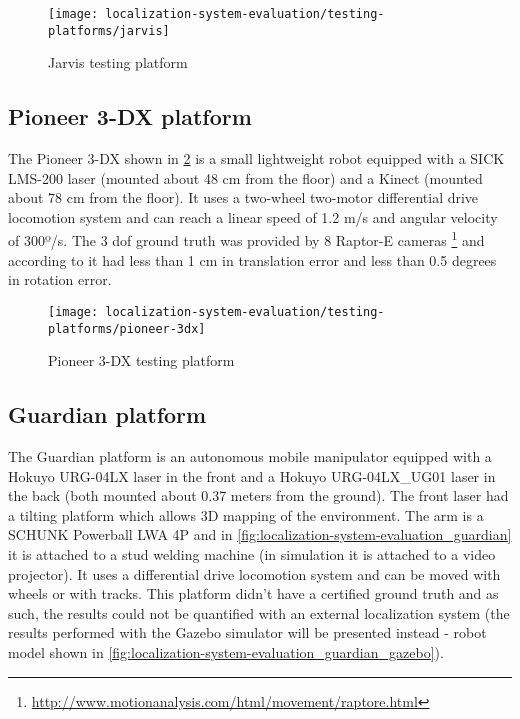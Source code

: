 \begin{figure}[H]
	\centering
	\texttt{[image: localization-system-evaluation/testing-platforms/jarvis]}
	\caption{Jarvis testing platform}
	\label{fig:localization-system-evaluation_jarvis}
\end{figure}


\subsection{Pioneer 3-DX platform}

The Pioneer 3-DX shown in \cref{fig:localization-system-evaluation_pioneer} is a small lightweight robot equipped with a SICK LMS-200 laser (mounted about 48 cm from the floor) and a Kinect (mounted about 78 cm from the floor). It uses a two-wheel two-motor differential drive locomotion system and can reach a linear speed of 1.2 m/s and angular velocity of 300º/s. The 3 \gls{dof} ground truth was provided by 8 Raptor-E cameras \footnote{\url{http://www.motionanalysis.com/html/movement/raptore.html}} and according to \cite{Sturm2012} it had less than 1 cm in translation error and less than 0.5 degrees in rotation error.

\begin{figure}[H]
	\centering
	\texttt{[image: localization-system-evaluation/testing-platforms/pioneer-3dx]}
	\caption{Pioneer 3-DX testing platform}
	\label{fig:localization-system-evaluation_pioneer}
\end{figure}


\subsection{Guardian platform}

The Guardian platform is an autonomous mobile manipulator equipped with a Hokuyo URG-04LX laser in the front and a Hokuyo URG-04LX\_UG01 laser in the back (both mounted about 0.37 meters from the ground). The front laser had a tilting platform which allows 3D mapping of the environment. The arm is a SCHUNK Powerball LWA 4P and in \cref{fig:localization-system-evaluation_guardian} it is attached to a stud welding machine (in simulation it is attached to a video projector). It uses a differential drive locomotion system and can be moved with wheels or with tracks. This platform didn't have a certified ground truth and as such, the results could not be quantified with an external localization system (the results performed with the Gazebo simulator will be presented instead - robot model shown in \cref{fig:localization-system-evaluation_guardian_gazebo}).

